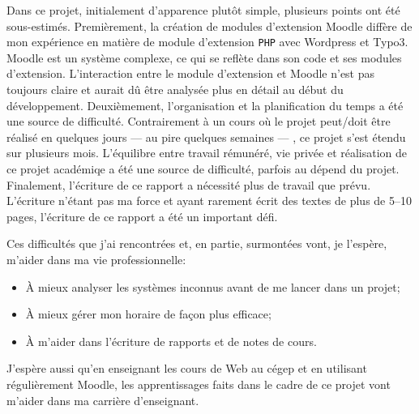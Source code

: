 \begin{conclusion}
Dans ce projet, initialement d'apparence plut\^ot simple, plusieurs points ont \'et\'e sous-estim\'es.
Premi\`erement, la cr\'eation de modules d'extension Moodle diff\`ere de mon exp\'erience en mati\`ere de module d'extension \texttt{PHP} avec Wordpress et Typo3.
Moodle est un syst\`eme complexe, ce qui se refl\`ete dans son code et ses modules d'extension.
L'interaction entre le module d'extension et Moodle n'est pas toujours claire et aurait d\^u \^etre analys\'ee plus en d\'etail au d\'ebut du d\'eveloppement.
Deuxi\`emement, l'organisation et la planification du temps a \'et\'e une source de difficult\'e.
Contrairement \`a un cours o\`u le projet peut/doit \^etre r\'ealis\'e en quelques jours --- au pire quelques semaines --- , ce projet s'est \'etendu sur plusieurs mois.
L'\'equilibre entre travail r\'emun\'er\'e,  vie priv\'ee et r\'ealisation de ce projet acad\'emiqe a \'et\'e une source de difficult\'e, parfois au d\'epend du projet.
Finalement, l'\'ecriture de ce rapport a n\'ecessit\'e plus de travail que pr\'evu.
L'\'ecriture n'\'etant pas ma force et ayant rarement \'ecrit des textes de plus de 5--10 pages, l'\'ecriture de ce rapport a \'et\'e un important d\'efi.

Ces difficult\'es que j'ai rencontr\'ees et, en partie, surmont\'ees vont, je l'esp\`ere, m'aider dans ma vie professionnelle:
\begin{itemize}
  \item \`A mieux analyser les syst\`emes inconnus avant de me lancer dans un projet;
  \item \`A mieux g\'erer mon horaire de fa\c{c}on plus efficace;
  \item \`A m'aider dans l'\'ecriture de rapports et de notes de cours.
\end{itemize}
J'esp\`ere aussi qu'en enseignant les cours de Web au c\'egep et en utilisant r\'eguli\`erement Moodle, les apprentissages faits dans le cadre de ce projet vont m'aider dans ma carri\`ere d'enseignant.
\end{conclusion}
